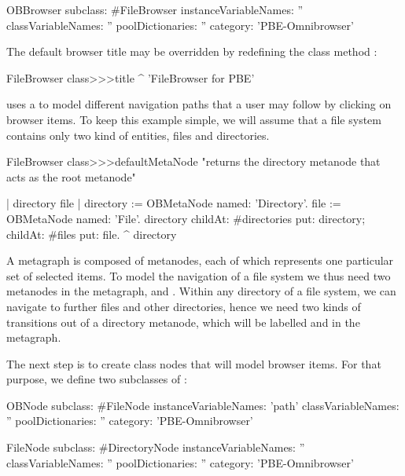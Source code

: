 \documentclass[a4paper,10pt,twoside]{book}
\begin{document}
\begin{code}{}
OBBrowser subclass: #FileBrowser
	instanceVariableNames: ''
	classVariableNames: ''
	poolDictionaries: ''
	category: 'PBE-Omnibrowser'
\end{code}

The default browser title may be overridden by redefining the class method :

\begin{code}{}
FileBrowser class>>>title
	^ 'FileBrowser for PBE'
\end{code}


\ob uses a  to model different navigation paths that a user may follow by clicking on browser items. 
To keep this example simple, we will assume that a file system contains only two kind of entities, files and directories. 

\begin{code}{}
FileBrowser class>>>defaultMetaNode
     "returns the directory metanode that acts as the root metanode"
 
     | directory file |
     directory := OBMetaNode named: 'Directory'.
     file := OBMetaNode named: 'File'.
     directory 
          childAt: #directories put: directory;
          childAt: #files put: file.
     ^ directory
\end{code}

A metagraph is composed of metanodes, each of which represents one particular set of selected items.
To model the navigation of a file system we thus need two metanodes in the metagraph,  and . Within any directory of a file system, we can navigate to further files and other directories, hence we need two kinds of transitions out of a directory metanode, which will be labelled  and  in the metagraph. 

The next step is to create class nodes that will model browser items. For that purpose, we define two subclasses of :

\begin{code}{}
OBNode subclass: #FileNode
	instanceVariableNames: 'path'
	classVariableNames: ''
	poolDictionaries: ''
	category: 'PBE-Omnibrowser'

FileNode subclass: #DirectoryNode
	instanceVariableNames: ''
	classVariableNames: ''
	poolDictionaries: ''
	category: 'PBE-Omnibrowser'
\end{code}
\end{document}
